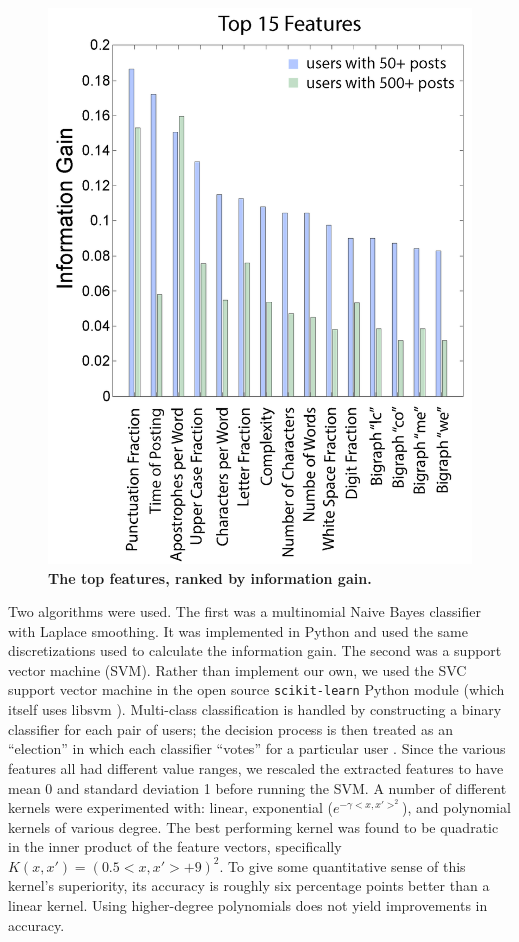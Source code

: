 \documentclass[12pt,letterpaper,onecolumn,oneside]{article}
\numberwithin{equation}{section}
\numberwithin{figure}{section}
\begin{document}
\begin{figure}[H]
 \centering
  \includegraphics[scale=0.4]{TopFeatures.png}
  \caption{\textbf{\footnotesize{The top features, ranked by information gain.}}}
  \label{infogain}
\end{figure}

Two algorithms were used. The first was a multinomial Naive Bayes classifier with Laplace smoothing. It was implemented in Python and used the same discretizations used to calculate the information gain. The second was 
a support vector machine (SVM). Rather than implement our own, we used the SVC support vector machine in the open source \verb+scikit-learn+ \cite{scikit-learn} Python module (which itself uses libsvm \cite{libsvm}). 
Multi-class classification is handled by constructing a binary classifier for each pair of users; the decision process is then treated as an ``election'' in which each classifier ``votes'' for a particular user 
\cite{libsvm}. Since the various features all had different value ranges, we rescaled the extracted features to have mean 0 and standard deviation 1 before running the SVM. A number of different kernels were 
experimented with: linear, exponential (\(e^{-\gamma <x,x'>^2}\)), and polynomial kernels of various degree. The best performing kernel was found to be quadratic in the inner product of the feature vectors, specifically 
\(K(x,x') = (0.5<x,x'>+9)^2\). To give some quantitative sense of this kernel's superiority, its accuracy is roughly six percentage points better than a linear kernel. Using higher-degree polynomials does not yield 
improvements in accuracy.
\end{document}
